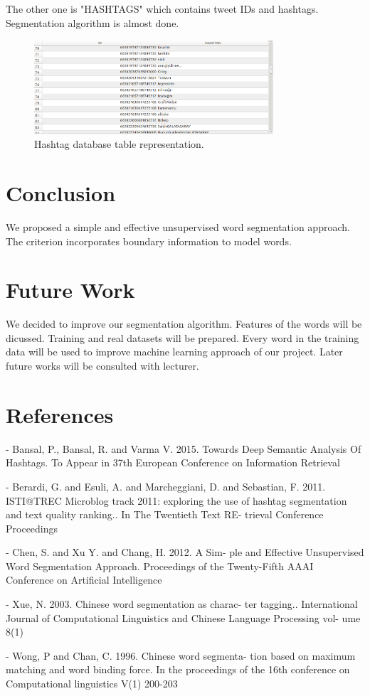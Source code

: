\documentclass[12pt]{comjnl}
\begin{document}
The other one is "HASHTAGS" which contains tweet IDs and hashtags. Segmentation algorithm
is almost done.

\begin{figure}
\centering
\includegraphics[width=3.5in]{hashtag.png}
\caption{Hashtag database table representation.}\label{fig:Hashtag}
\end{figure}

\section{Conclusion}
We proposed a simple and effective unsupervised
word segmentation approach. The criterion incorporates
boundary information to model words. 

\section{Future Work}
We decided to improve our segmentation algorithm. Features of the words will be dicussed. Training and real
datasets will be prepared. Every word in the training data will be used to improve machine
learning approach of our project. Later future works will be consulted with lecturer.

\section{References}
- Bansal, P., Bansal, R. and Varma V. 2015. Towards
Deep Semantic Analysis Of Hashtags. To Appear in
37th European Conference on Information Retrieval

- Berardi, G. and Esuli, A. and Marcheggiani, D. and
Sebastian, F. 2011. ISTI@TREC Microblog track
2011: exploring the use of hashtag segmentation
and text quality ranking.. In The Twentieth Text RE-
trieval Conference Proceedings

- Chen, S. and Xu Y. and Chang, H. 2012. A Sim-
ple and Effective Unsupervised Word Segmentation
Approach. Proceedings of the Twenty-Fifth AAAI
Conference on Artificial Intelligence

- Xue, N. 2003. Chinese word segmentation as charac-
ter tagging.. International Journal of Computational
Linguistics and Chinese Language Processing vol-
ume 8(1)

- Wong, P and Chan, C. 1996. Chinese word segmenta-
tion based on maximum matching and word binding
force. In the proceedings of the 16th conference on
Computational linguistics V(1) 200-203
\nocite{*}



\end{document}
